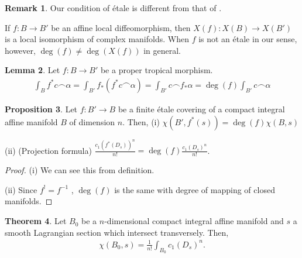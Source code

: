 \documentclass[a4paper,dvipdfmx,reqno,12pt]{amsart}
\theoremstyle{definition}
\newtheorem{Thm}{Theorem}[section]
\newtheorem{Prop}[Thm]{Proposition}
\newtheorem{Lem}[Thm]{Lemma}
\newtheorem{Rmk}[Thm]{Remark}
\newcommand{\opn}[1]{\operatorname{#1}}
\numberwithin{equation}{section}
\begin{document}
\begin{Rmk}
Our condition of \'etale is different from that of 
\cite[Definition 1.1]{grossMirrorSymmetryLogarithmic2006a}.

If $f\colon B\to B'$ be an affine local diffeomorphism,
then $X(f)\colon X(B) \to X(B')$ is a local isomorphism of
complex manifolds.
When $f$ is not an \'etale in our sense, however,
$\opn{deg}(f)\ne \opn{deg}(X(f))$ in general.

\end{Rmk}

\begin{Lem}
  Let $f:B\to B'$ be a proper tropical morphism.
  \begin{align}
    \int_{B} f^{*}c\frown \alpha=\int_{B'} f_*(f^{*}c\frown \alpha)
    =\int_{B'}c \frown f_*\alpha=\opn{deg}(f)\int_{B'} c\frown \alpha
  \end{align}
\end{Lem}

\begin{Prop} \label{thm: intetale}
Let $f\colon B'\to B$ be a finite \'etale covering of a compact integral affine 
manifold $B$ of dimension $n$. Then,
(i) $\chi(B',f^{*}(s))=\opn{deg}(f)\chi(B,s)$

(ii) (Projection formula) 
$\frac{c_1(f^{*}(D_s))^{n}}{n!}=
\opn{deg}(f)\frac{c_1(D_s)^{n}}{n!}$.
\end{Prop}
\begin{proof}
(i) We can see this from definition.

(ii) Since $f^{!}=f^{-1}$ 
\cite[]{iversenCohomologySheaves1986a}
, $\opn{deg}(f)$ is the same with degree of 
mapping of closed manifolds.

\end{proof}

\begin{Thm} \label{thm: HesseRR}
  Let $B_0$ be a $n$-dimensional compact integral affine manifold and
  $s$ a smooth Lagrangian section
  which intersect transversely. Then,
  \begin{align} \label{eq: HesseRR}
    \chi(B_0,s)=\frac{1}{n!}\int_{B_0}c_1(D_s)^{n}.
  \end{align}
\end{Thm}
\end{document}

